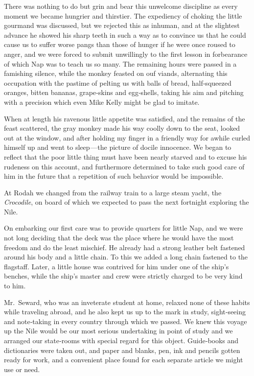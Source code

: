 \documentclass[12pt]{book}
\begin{document}
There was nothing to do but grin and bear this unwelcome discipline as every
moment we became hungrier and thirstier. The expediency of choking the little
gourmand was discussed, but we rejected this as inhuman, and at the slightest
advance he showed his sharp teeth in such a way as to convince us that he could
cause us to suffer worse pangs than those of hunger if he were once roused to
anger, and we were forced to submit unwillingly to the first lesson in forbearance
of which Nap was to teach us so many. The remaining hours were passed in
a famishing silence, while the monkey feasted on ouf viands, alternating this
occupation with the pastime of pelting us with balls of bread, half‐squeezed
oranges, bitten bananas, grape‐skins and egg‐shells, taking his aim and pitching
with a precision which even Mike Kelly might be glad to imitate.

When at length his ravenous little appetite was satisfied, and the remains
of the feast scattered, the gray monkey made his way coolly down to the seat,
looked out at the window, and after holding my finger in a friendly way for awhile
curled himself up and went to sleep — the picture of docile innocence. We began
to reflect that the poor little thing must have been nearly starved and to excuse
his rudeness on this account, and furthermore determined to take such good care
of him in the future that a repetition of such behavior would be impossible.

At Rodah we changed from the railway train to a large steam yacht, the
{\it Crocodile}, on board of which we expected to pass the next fortnight exploring the
Nile.

On embarking our first care was to provide quarters for little Nap, and we
were not long deciding that the deck was the place where he would have the most
freedom and do the least mischief. He already had a strong leather belt fastened
around his body and a little chain. To this we added a long chain fastened to
the flagstaff. Later, a little house was contrived for him under one of the ship’s
benches, while the ship’s master and crew were strictly charged to be very kind
to him.

Mr.~Seward, who was an inveterate student at home, relaxed none of these
habits while traveling abroad, and he also kept us up to the mark in study, sight‐seeing and note‐taking in every country through which we passed. We knew this
voyage up the Nile would be our most serious undertaking in point of study and
we arranged our state‐rooms with special regard for this object. Guide‐books and
dictionaries were taken out, and paper and blanks, pen, ink and pencils gotten
ready for work, and a convenient place found for each separate article we might
use or need.
\end{document}
